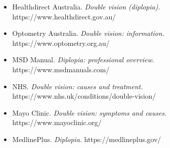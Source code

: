 \begin{itemize}
    \item Healthdirect Australia. \textit{Double vision (diplopia).} https://www.healthdirect.gov.au/
    \item Optometry Australia. \textit{Double vision: information.} https://www.optometry.org.au/
    \item MSD Manual. \textit{Diplopia: professional overview.} https://www.msdmanuals.com/
    \item NHS. \textit{Double vision: causes and treatment.} https://www.nhs.uk/conditions/double-vision/
    \item Mayo Clinic. \textit{Double vision: symptoms and causes.} https://www.mayoclinic.org/
    \item MedlinePlus. \textit{Diplopia.} https://medlineplus.gov/
\end{itemize}
